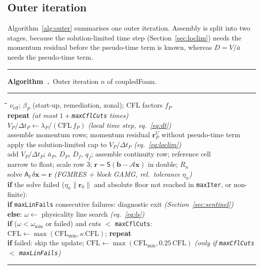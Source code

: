 \documentclass[11pt,a4paper]{article}
\newcounter{algorithm}
\newenvironment{algo}[2]{%
  \par\medskip\noindent
  \begin{minipage}{\linewidth}
  \refstepcounter{algorithm}\label{#2}%
  \hrule\smallskip\noindent\textbf{Algorithm~\thealgorithm.}\ #1\par
  \smallskip\hrule\smallskip\small
  \begin{tabbing}
  \hspace*{2em}\=\hspace*{2em}\=\hspace*{2em}\=\hspace*{2em}\=\kill}
  {\end{tabbing}\vspace*{-1ex}\hrule\end{minipage}\par\medskip}
\newcommand{\vect}[1]{\mathbf{#1}}
\newcommand{\dt}{\Delta t}
\newcommand{\code}[1]{\texttt{#1}}
\begin{document}
\subsection{Outer iteration}

Algorithm~\ref{alg:outer} summarises one outer iteration. Assembly is split
into two stages, because the solution-limited time step
(Section~\ref{sec:loclim}) needs the momentum residual before the pseudo-time
term is known, whereas $D=V/\bar a$ needs the pseudo-time term.

\begin{algo}{Outer iteration $n$ of coupledFoam.}{alg:outer}
$\nu_{\mathrm{eff}}$; $\beta_P$ (start-up, remediation, zonal); CFL factors $f_P$\\
\textbf{repeat} \quad \textit{(at most $1+{}$\code{maxCflCuts} times)}\\
\> $V_P/\dt_P \leftarrow \lambda_P/(\mathrm{CFL}\,f_P)$ \quad \textit{(local time step, eq.~\ref{eq:dt})}\\
\> assemble momentum rows; momentum residual $\vect r^{U}_P$ without pseudo-time term\\
\> apply the solution-limited cap to $V_P/\dt_P$ \quad \textit{(eq.~\ref{eq:loclim})}\\
\> add $V_P/\dt_P$; $\bar a_P$, $D_P$, $D_f$, $q_f$; assemble continuity row; reference cell\\
\> narrow to float; scale row 3; $\vect r=\mathsf S(\vect b-\mathcal A\vect x)$ in double; $R_n$\\
\> solve $\mathsf A_{\mathrm f}\,\delta\vect x=\vect r$ \quad \textit{(FGMRES + block GAMG, rel.\ tolerance $\eta_n$)}\\
\> \textbf{if} the solve failed ($\eta_n\|\vect r_0\|$ and absolute floor not reached in \code{maxIter}, or non-finite):\\
\> \> \textbf{if} \code{maxLinFails} consecutive failures: diagnostic exit \quad \textit{(Section~\ref{sec:sentinel})}\\
\> \textbf{else}: $\omega\leftarrow$ physicality line search \quad \textit{(eq.~\ref{eq:ls})}\\
\> \textbf{if} ($\omega<\omega_{\min}$ or failed) and cuts $<$ \code{maxCflCuts}:\\
\> \> $\mathrm{CFL}\leftarrow\max(\mathrm{CFL}_{\min},\kappa\,\mathrm{CFL})$; \textbf{repeat}\\
\textbf{if} failed: skip the update; $\mathrm{CFL}\leftarrow\max(\mathrm{CFL}_{\min},0.25\,\mathrm{CFL})$ \quad \textit{(only if \code{maxCflCuts} $<$ \code{maxLinFails})}\\

\end{algo}
\end{document}
